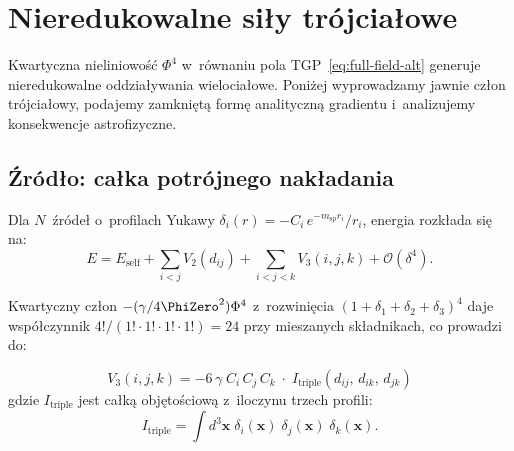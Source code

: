 \section{Nieredukowalne si\l{}y tr\'ojcia\l{}owe}%
\label{app:three-body}

Kwartyczna nieliniowo\'s\'c $\Phi^4$ w~r\'ownaniu pola
TGP~\eqref{eq:full-field-alt} generuje
nieredukowalne oddzia\l{}ywania wielocia\l{}owe.
Poni\.zej wyprowadzamy jawnie cz\l{}on tr\'ojcia\l{}owy,
podajemy zamkni\k{e}t\k{a} form\k{e} analityczn\k{a} gradientu
i~analizujemy konsekwencje astrofizyczne.

\subsection{\'Zr\'od\l{}o: ca\l{}ka potr\'ojnego nak\l{}adania}

Dla $N$~\'zr\'ode\l{} o~profilach Yukawy
$\delta_i(r) = -C_i\,e^{-m_{\mathrm{sp}} r_i}/r_i$,
energia rozk\l{}ada si\k{e} na:
\begin{equation}\label{eq:energy-3b-decomp}
  E = E_{\mathrm{self}}
    + \sum_{i<j} V_2(d_{ij})
    + \sum_{i<j<k} V_3(i,j,k)
    + \mathcal{O}(\delta^4).
\end{equation}

Kwartyczny cz\l{}on $-(\gamma/4\PhiZero^2)\Phi^4$ z~rozwini\k{e}cia
$(1+\delta_1+\delta_2+\delta_3)^4$ daje wsp\'o\l{}czynnik
$4!/(1!\cdot1!\cdot1!\cdot1!) = 24$ przy mieszanych sk\l{}adnikach,
co prowadzi do:

\begin{proposition}%
\label{prop:V3-def}
\begin{equation}\label{eq:V3-main}
  \boxed{
    V_3(i,j,k) = -6\,\gamma\;C_i\,C_j\,C_k
    \;\cdot\; I_{\mathrm{triple}}(d_{ij},\, d_{ik},\, d_{jk})
  }
\end{equation}
gdzie $I_{\mathrm{triple}}$ jest ca\l{}k\k{a} obj\k{e}to\'sciow\k{a}
z~iloczynu trzech profili:
\begin{equation}
  I_{\mathrm{triple}} = \int d^3\mathbf{x}\;
  \delta_i(\mathbf{x})\;\delta_j(\mathbf{x})\;\delta_k(\mathbf{x}).
\end{equation}
\end{proposition}

